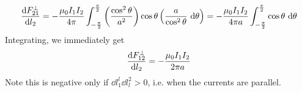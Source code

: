 \documentclass[../electromagnetism]{subfiles}
\begin{document}
\begin{equation*}
	\dv{F_{21}^\perp}{l_2}=-\frac{\mu_0I_1I_2}{4\pi}\int_{-\frac{\pi}{2}}^{\frac{\pi}{2}}\left( \frac{\cos^2\theta}{a^2} \right)\cos\theta\left( \frac{a}{\cos^2\theta}\ \mathrm{d}\theta \right)=-\frac{\mu_0I_1I_2}{4\pi a}\int_{-\frac{\pi}{2}}^{\frac{\pi}{2}}\cos\theta\ \mathrm{d}\theta
\end{equation*}
Integrating, we immediately get
\begin{equation}
	\dv{F_{12}^\perp}{l_2}=-\frac{\mu_0I_1I_2}{2\pi a}
	\label{eq:forcewiresinf}
\end{equation}
Note this is negative only if $\dd l^l_1\dd l^2_l>0$, i.e. when the currents are parallel.
\end{document}

